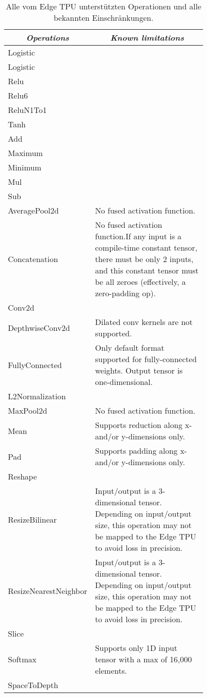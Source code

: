 \begin{table}[htbp]
	\centering
	\begin{tabular}{|l|p{0.8\linewidth}|}
		\hline
		\multicolumn{1}{|c|}{\textit{\textbf{Operations}}} & \multicolumn{1}{c|}{\textit{\textbf{Known limitations}}}                                                   \tabularnewline \hline
		Logistic                                           &                                                   \tabularnewline \hline
		Logistic	                                      &                                                     \tabularnewline \hline
		Relu	                                              & \tabularnewline \hline
		Relu6	                                       & \tabularnewline \hline
		ReluN1To1	                                       & \tabularnewline \hline
		Tanh	                                               & \tabularnewline \hline
		Add	                                               & \tabularnewline \hline
		Maximum	                                       & \tabularnewline \hline
		Minimum	                                       & \tabularnewline \hline
		Mul	                                               & \tabularnewline \hline
		Sub	                                                & \tabularnewline \hline
		AveragePool2d	& No fused activation function.  \tabularnewline \hline
		Concatenation & 	No fused activation function.If any input is a compile-time constant tensor, there must be only 2 inputs, and this constant tensor must be all zeroes (effectively, a zero-padding op).  \tabularnewline \hline
		Conv2d	        &                           \tabularnewline \hline
		
		DepthwiseConv2d  &	Dilated conv kernels are not supported.  \tabularnewline \hline
		FullyConnected	& Only default format supported for fully-connected weights. Output tensor is one-dimensional. \tabularnewline \hline
		L2Normalization	 \tabularnewline \hline
		MaxPool2d  &	No fused activation function.  \tabularnewline \hline
		Mean & 	Supports reduction along x- and/or y-dimensions only.  \tabularnewline \hline
		Pad &	Supports padding along x- and/or y-dimensions only.  \tabularnewline \hline
		Reshape	 \tabularnewline \hline
		ResizeBilinear &	Input/output is a 3-dimensional tensor. Depending on input/output size, this operation may not be mapped to the Edge TPU to avoid loss in precision.  \tabularnewline \hline
		ResizeNearestNeighbor &	Input/output is a 3-dimensional tensor. Depending on input/output size, this operation may not be mapped to the Edge TPU to avoid loss in precision.  \tabularnewline \hline
		Slice	&       \tabularnewline \hline
		Softmax &	Supports only 1D input tensor with a max of 16,000 elements.  \tabularnewline \hline
		SpaceToDepth &	\tabularnewline \hline
		
		
	\end{tabular}
	\caption{Alle vom Edge TPU unterstützten Operationen und alle bekannten Einschränkungen.}
\end{table}


